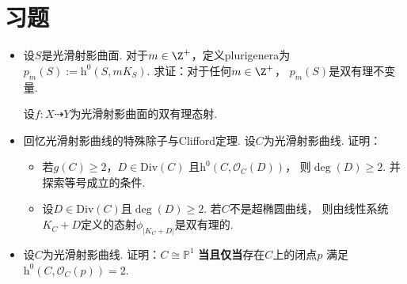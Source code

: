 \section{习题}
\begin{itemize}
    \item[1.1] 设$S$是光滑射影曲面. 
            对于$m \in \Z^{+}$，定义plurigenera为
            $p_{m}(S) := \mathrm{h}^{0}(S,mK_{S})$.
            求证：对于任何$m \in \Z^{+}$，
            $p_{m}(S)$是双有理不变量.
    \begin{proofc}[解答]
        设$f:X \dashrightarrow Y$为光滑射影曲面的双有理态射.
    \end{proofc}

    \item[1.2] 回忆光滑射影曲线的特殊除子与Clifford定理. 
               设$C$为光滑射影曲线. 证明：
    \begin{itemize}
        \item[(1)] 若$g(C) \geq 2$，$D \in \mathrm{Div}(C)$
            且$\mathrm{h}^{0}(C,\mathscr{O}_{C}(D))$，
            则$\deg(D) \geq 2$.
            并探索等号成立的条件.
        \begin{proofc}[解答]

        \end{proofc}

        \item[(2)] 设$D \in \mathrm{Div}(C)$且$\deg(D) \geq 2$.
            若$C$不是超椭圆曲线，
            则由线性系统$K_{C} + D$定义的态射$\phi_{|K_{C} + D|}$是双有理的.     
        \begin{proofc}[解答]

        \end{proofc}
    \end{itemize}

    \item[1.3] 设$C$为光滑射影曲线. 证明：$C \cong \mathbb{P}^{1}$
        \textbf{当且仅当}存在$C$上的闭点$p$
        满足$\mathrm{h}^{0}(C,\mathscr{O}_{C}(p)) = 2$.
    \begin{proofc}[解答]

    \end{proofc}
\end{itemize}
